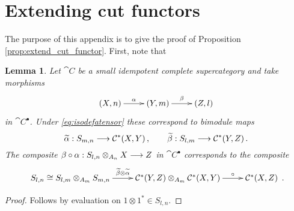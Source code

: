 \documentclass[english,letter paper,12pt,leqno]{article}
\newtheorem{lemma}[theorem]{Lemma}
\theoremstyle{example}
\numberwithin{equation}{section}
\begin{document}
\section{Extending cut functors}\label{app:proof_cut_extension}

The purpose of this appendix is to give the proof of Proposition \ref{prop:extend_cut_functor}. First, note that

\begin{lemma}\label{lemma:altcomppersp} Let $\cat{C}$ be a small idempotent complete supercategory and take morphisms
\[
\xymatrix{
(X,n) \ar[r]^-{\alpha} & (Y,m) \ar[r]^-{\beta} & (Z,l)
}\\
\]
in $\cat{C}^\bullet$. Under \eqref{eq:isodefatensor} these correspond to bimodule maps
\[
\widetilde{\alpha}: S_{m,n} \longrightarrow \mathcal{C}^*(X,Y)\,, \qquad \widetilde{\beta}: S_{l,m} \longrightarrow \mathcal{C}^*(Y,Z)\,.
\]
The composite $\beta \circ \alpha: S_{l,n} \otimes_{A_n} X \longrightarrow Z$ in $\cat{C}^\bullet$ corresponds to the composite
\[
\xymatrix{
S_{l,n} \cong S_{l,m} \otimes_{A_m} S_{m,n} \ar[r]^-{\widetilde{\beta} \otimes \widetilde{\alpha}} & \cat{C}^*(Y,Z) \otimes_{A_m} \cat{C}^*(X,Y) \ar[r]^-{\circ} & \cat{C}^*(X,Z)
}\,.
\]
\end{lemma}
\begin{proof}
Follows by evaluation on $1 \otimes 1^* \in S_{l,n}$.
\end{proof}
\end{document}
